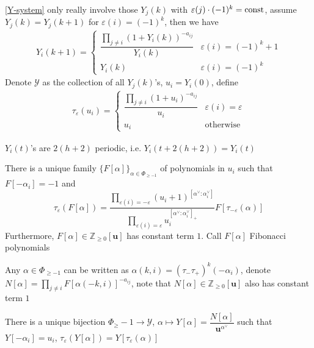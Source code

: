 \documentclass[main]{subfiles}
\begin{document}
\begin{remark}
\eqref{Y-system} only really involve those $Y_j(k)$ with $\varepsilon(j)\cdot(-1)^k=\operatorname{const}$, assume $Y_j(k)=Y_j(k+1)$ for $\varepsilon(i)=(-1)^k$, then we have
\begin{align*}
Y_i(k+1)=\begin{cases}
\dfrac{\prod_{j\neq i}(1+Y_i(k))^{-a_{ij}}}{Y_i(k)} &\varepsilon(i)=(-1)^k+1 \\
Y_i(k) &\varepsilon(i)=(-1)^k
\end{cases}
\end{align*}
Denote $\mathcal Y$ as the collection of all $Y_j(k)$'s, $u_i=Y_i(0)$, define
\begin{align*}
\tau_\varepsilon(u_i)=\begin{cases}
\dfrac{\prod_{j\neq i}(1+u_i)^{-a_{ij}}}{u_i} &\varepsilon(i)=\varepsilon \\
u_i &\text{otherwise}
\end{cases}
\end{align*}
\end{remark}

\begin{theorem}[Zamolodichikov]
$Y_i(t)$'s are $2(h+2)$ periodic, i.e. $Y_{i}(t+2(h+2))=Y_i(t)$
\end{theorem}

\begin{theorem}
There is a unique family $\{F[\alpha]\}_{\alpha\in\Phi_{\geq-1}}$ of polynomials in $u_i$ such that $F[-\alpha_i]=-1$ and
\[\tau_\varepsilon(F[\alpha])=\frac{\displaystyle\prod_{\varepsilon(i)=-\varepsilon}(u_i+1)^{[\alpha^\vee:\alpha_i^\vee]}}{\displaystyle\prod_{\varepsilon(i)=\varepsilon}u_i^{[\alpha^\vee:\alpha_i^\vee]_+}}F[\tau_{-\varepsilon}(\alpha)]\]
Furthermore, $F[\alpha]\in\mathbb Z_{\geq0}[\mathbf u]$ has constant term $1$. Call $F[\alpha]$ Fibonacci polynomials \par
Any $\alpha\in\Phi_{\geq-1}$ can be written as $\alpha(k,i)=(\tau_-\tau_+)^k(-\alpha_i)$, denote $N[\alpha]=\displaystyle\prod_{j\neq i}F[\alpha(-k,i)]^{-a_{ij}}$, note that $N[\alpha]\in\mathbb Z_{\geq0}[\mathbf u]$ also has constant term $1$
\end{theorem}

\begin{theorem}
There is a unique bijection $\Phi_\geq-1\to\mathcal Y$, $\alpha\mapsto Y[\alpha]=\dfrac{N[\alpha]}{\mathbf u^{\alpha^\vee}}$ such that $Y[-\alpha_i]=u_i$, $\tau_\varepsilon(Y[\alpha])=Y[\tau_\varepsilon(\alpha)]$
\end{theorem}
\end{document}
